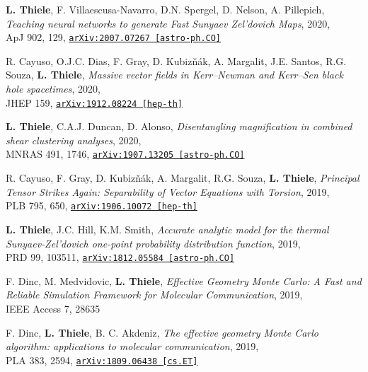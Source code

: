 \begin{minipage}{\textwidth}
{\bf L. Thiele}, F. Villaescusa-Navarro, D.N. Spergel, D. Nelson, A. Pillepich,
\emph{Teaching neural networks to generate Fast Sunyaev Zel'dovich Maps}, 2020,\\
ApJ 902, 129,
\href{https://arxiv.org/abs/2007.07267}{\mbox{\texttt{arXiv:2007.07267 [astro-ph.CO]}}}
\end{minipage}

\begin{minipage}{\textwidth}
R. Cayuso, O.J.C. Dias, F. Gray, D. Kubiz\v{n}\'{a}k, A. Margalit, J.E. Santos,
R.G. Souza, {\bf L. Thiele},
\emph{Massive vector fields in Kerr--Newman and Kerr--Sen black hole spacetimes}, 2020,\\
JHEP 159,
\href{https://arxiv.org/abs/1912.08224}{\mbox{\texttt{arXiv:1912.08224 [hep-th]}}}
\end{minipage}

\begin{minipage}{\textwidth}
{\bf L. Thiele}, C.A.J. Duncan, D. Alonso,
\emph{Disentangling magnification in combined shear clustering analyses}, 2020,\\
MNRAS 491, 1746,
\href{https://arxiv.org/abs/1907.13205}{\mbox{\texttt{arXiv:1907.13205 [astro-ph.CO]}}}
\end{minipage}

\begin{minipage}{\textwidth}
R. Cayuso, F. Gray, D. Kubiz\v{n}\'{a}k, A. Margalit, R.G. Souza, {\bf L. Thiele},
\emph{Principal Tensor Strikes Again: Separability of Vector Equations with Torsion}, 2019,\\
PLB 795, 650,
\href{https://arxiv.org/abs/1906.10072}{\mbox{\texttt{arXiv:1906.10072 [hep-th]}}}
\end{minipage}

\begin{minipage}{\textwidth}
{\bf L. Thiele}, J.C. Hill, K.M. Smith, \emph{Accurate analytic model for the thermal
Sunyaev-Zel'dovich one-point probability distribution function}, 2019,\\
PRD 99, 103511,
\href{https://arxiv.org/abs/1812.05584}{\mbox{\texttt{arXiv:1812.05584 [astro-ph.CO]}}}
\end{minipage}

\begin{minipage}{\textwidth}
F. Dinc, M. Medvidovic, {\bf L. Thiele}, \emph{Effective Geometry Monte Carlo: A Fast and
Reliable Simulation Framework for Molecular Communication}, 2019,\\
IEEE Access 7, 28635
\end{minipage}

\begin{minipage}{\textwidth}
F. Dinc, {\bf L. Thiele}, B. C. Akdeniz, \emph{The effective geometry Monte Carlo
algorithm: applications to molecular communication}, 2019,\\
PLA 383, 2594,
\href{https://arxiv.org/abs/1809.06438}{\mbox{\texttt{arXiv:1809.06438 [cs.ET]}}}
\end{minipage}
